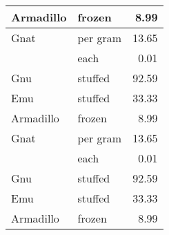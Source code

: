 {\begin{center}
\begin{xtabular}{|l|l|r|}
\hline
{}Armadillo & frozen   & 8.99  \\
\hline
{}Gnat      & per gram & 13.65 \\
\hline
{}          & each     & 0.01  \\
\hline
{}Gnu       & stuffed  & 92.59 \\
\hline
{}Emu       & stuffed  & 33.33 \\
\hline
{}Armadillo & frozen   & 8.99  \\
\hline
{}Gnat      & per gram & 13.65 \\
\hline
{}          & each     & 0.01  \\
\hline
{}Gnu       & stuffed  & 92.59 \\
\hline
{}Emu       & stuffed  & 33.33 \\
\hline
{}Armadillo & frozen   & 8.99  \\
\hline
\end{xtabular}
\end{center}
} 
